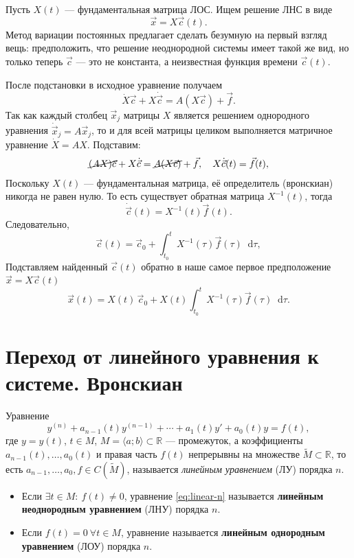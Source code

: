 \documentclass[12pt,a4paper]{article}
\numberwithin{equation}{section}
\newcommand{\R}{\mathbb{R}}
\newcommand{\vect}[1]{\vec{#1}}
\newcommand{\dd}{\mathop{}\!\mathrm{d}}
\begin{document}
\begin{theoremHSE}
Пусть $X(t)$ --- фундаментальная матрица ЛОС. Ищем решение ЛНС в виде
\[
\vect{x}=X\vect{c}(t).
\]
Метод вариации постоянных предлагает сделать безумную на первый взгляд вещь: предположить, что решение неоднородной системы имеет такой же вид, но только теперь \(\vect{c}\) — это не константа, а неизвестная функция времени \(\vect{c}(t)\).

После подстановки в исходное уравнение получаем
\[
\dot{X}\vect{c}+X\dot{\vect{c}}=A(X\vect{c})+\vect{f}.
\]
Так как каждый столбец \(\vect{x}_j\) матрицы \(X\) является решением однородного уравнения \(\dot{\vect{x}}_j=A\vect{x}_j\), то и для всей матрицы целиком выполняется матричное уравнение \(\dot{X}=AX\). Подставим:
\begin{gather*}
\cancel{(AX)\vect{c}}+X\dot{\vect{c}}=\cancel{A(X\vect{c})}+\vect{f},\quad X\dot{\vect{c}}(t)=\vect{f}(t),
\end{gather*}
Поскольку \(X(t)\) --- фундаментальная матрица, её определитель (вронскиан) никогда не равен нулю. То есть существует обратная матрица \(X^{-1}(t)\), тогда
\[
\dot{\vect{c}}(t)=X^{-1}(t)\vect{f}(t).
\]
Следовательно,
\[
\vect{c}(t)=\vect{c}_0+
\int_{t_0}^{t}X^{-1}(\tau)\vect{f}(\tau)\dd\tau,
\]
Подставляем найденный \(\vect{c}(t)\) обратно в наше самое первое предположение \(\vect{x}=X\vect{c}(t)\)
\begin{equation}
\vect{x}(t)=
X(t)\,\vect{c}_0+
X(t)\int_{t_0}^{t}X^{-1}(\tau)\vect{f}(\tau)\dd\tau.
\label{eq:variation-system}
\end{equation}
\end{theoremHSE}

\section[ЛУ \texorpdfstring{$n$}{n}-го порядка и система]{Переход от линейного уравнения к системе. Вронскиан}

\begin{definitionHSE}
Уравнение
\begin{equation}
y^{(n)}+a_{n-1}(t)y^{(n-1)}+\cdots+a_1(t)y'+a_0(t)y=f(t),
\label{eq:linear-n}
\end{equation}
где \(y=y(t)\), \(t\in M\), \(M=\langle a;b\rangle\subset\R\) --- промежуток, а коэффициенты \(a_{n-1}(t),\ldots,a_0(t)\) и правая часть \(f(t)\) непрерывны на множестве \(\tilde{M}\subset\R\), то есть \(a_{n-1},\ldots,a_0,f\in C(\tilde{M})\), называется \textit{линейным уравнением} (ЛУ) порядка \(n\).
\begin{itemize}
\item Если \(\exists t\in M:\ f(t)\neq0\), уравнение \eqref{eq:linear-n} называется \textbf{линейным неоднородным уравнением} (ЛНУ) порядка \(n\).
\item Если \(f(t)=0\ \forall t\in M\), уравнение называется \textbf{линейным однородным уравнением} (ЛОУ) порядка \(n\).
\end{itemize}
\end{definitionHSE}
\end{document}
